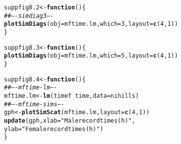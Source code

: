 \documentclass[12pt, a4paper,  BCOR=8.25mm, DIV=15]{scrartcl}\usepackage[]{graphicx}\usepackage[]{color}
\makeatletter
\newcommand{\hlnum}[1]{\textcolor[rgb]{0.686,0.059,0.569}{#1}}%
\newcommand{\hlstr}[1]{\textcolor[rgb]{0.192,0.494,0.8}{#1}}%
\newcommand{\hlcom}[1]{\textcolor[rgb]{0.678,0.584,0.686}{\textit{#1}}}%
\newcommand{\hlopt}[1]{\textcolor[rgb]{0,0,0}{#1}}%
\newcommand{\hlstd}[1]{\textcolor[rgb]{0.345,0.345,0.345}{#1}}%
\newcommand{\hlkwa}[1]{\textcolor[rgb]{0.161,0.373,0.58}{\textbf{#1}}}%
\newcommand{\hlkwb}[1]{\textcolor[rgb]{0.69,0.353,0.396}{#1}}%
\newcommand{\hlkwc}[1]{\textcolor[rgb]{0.333,0.667,0.333}{#1}}%
\newcommand{\hlkwd}[1]{\textcolor[rgb]{0.737,0.353,0.396}{\textbf{#1}}}%
\newenvironment{kframe}{%
 \def\at@end@of@kframe{}%
 \ifinner\ifhmode%
  \def\at@end@of@kframe{\end{minipage}}%
  \begin{minipage}{\columnwidth}%
 \fi\fi%
 \def\FrameCommand##1{\hskip\@totalleftmargin \hskip-\fboxsep
 \colorbox{shadecolor}{##1}\hskip-\fboxsep
     \hskip-\linewidth \hskip-\@totalleftmargin \hskip\columnwidth}%
 \MakeFramed {\advance\hsize-\width
   \@totalleftmargin\z@ \linewidth\hsize
   \@setminipage}}%
 {\par\unskip\endMakeFramed%
 \at@end@of@kframe}
\newenvironment{knitrout}{}{} %
\makeatother
\begin{document}
\begin{knitrout}
\color{fgcolor}\begin{kframe}
\begin{alltt}
\hlstd{suppfig8.2} \hlkwb{<-} \hlkwa{function}\hlstd{()\{}
\hlcom{## ---- simdiag3 ----}
\hlkwd{plotSimDiags}\hlstd{(}\hlkwc{obj}\hlstd{=mftime.lm,} \hlkwc{which}\hlstd{=}\hlnum{3}\hlstd{,} \hlkwc{layout}\hlstd{=}\hlkwd{c}\hlstd{(}\hlnum{4}\hlstd{,}\hlnum{1}\hlstd{))}
\hlstd{\}}
\end{alltt}
\end{kframe}
\end{knitrout}

\begin{knitrout}
\color{fgcolor}\begin{kframe}
\begin{alltt}
\hlstd{suppfig8.3} \hlkwb{<-} \hlkwa{function}\hlstd{()\{}
\hlkwd{plotSimDiags}\hlstd{(}\hlkwc{obj}\hlstd{=mftime.lm,} \hlkwc{which}\hlstd{=}\hlnum{5}\hlstd{,} \hlkwc{layout}\hlstd{=}\hlkwd{c}\hlstd{(}\hlnum{4}\hlstd{,}\hlnum{1}\hlstd{))}
\hlstd{\}}
\end{alltt}
\end{kframe}
\end{knitrout}

\begin{knitrout}
\color{fgcolor}\begin{kframe}
\begin{alltt}
\hlstd{suppfig8.4} \hlkwb{<-} \hlkwa{function}\hlstd{()\{}
\hlcom{## ---- mftime-lm ----}
\hlstd{mftime.lm} \hlkwb{<-} \hlkwd{lm}\hlstd{(timef} \hlopt{~} \hlstd{time,} \hlkwc{data}\hlstd{=nihills)}
\hlcom{## ---- mftime-sims ----}
\hlstd{gph} \hlkwb{<-} \hlkwd{plotSimScat}\hlstd{(mftime.lm,} \hlkwc{layout}\hlstd{=}\hlkwd{c}\hlstd{(}\hlnum{4}\hlstd{,}\hlnum{1}\hlstd{))}
\hlkwd{update}\hlstd{(gph,} \hlkwc{xlab}\hlstd{=}\hlstr{"Male record times (h)"}\hlstd{,}
       \hlkwc{ylab}\hlstd{=}\hlstr{"Female record times (h)"}\hlstd{)}
\hlstd{\}}
\end{alltt}
\end{kframe}
\end{knitrout}
\end{document}
